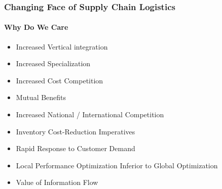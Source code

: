 \begin{frame}
  \frametitle{Changing Face of Supply Chain Logistics}
  \framesubtitle{Why Do We Care}
  \begin{itemize}
    \item<1-> Increased Vertical integration
    \item <2-> Increased Specialization
    \item <3-> Increased Cost Competition
    \item <4-> Mutual Benefits
    \item <5-> Increased National / International Competition
    \item <6-> Inventory Cost-Reduction Imperatives
    \item <7-> Rapid Response to Customer Demand
    \item <8-> Local Performance Optimization Inferior to Global Optimization
    \item <9-> Value of Information Flow


  \end{itemize}
\end{frame}
